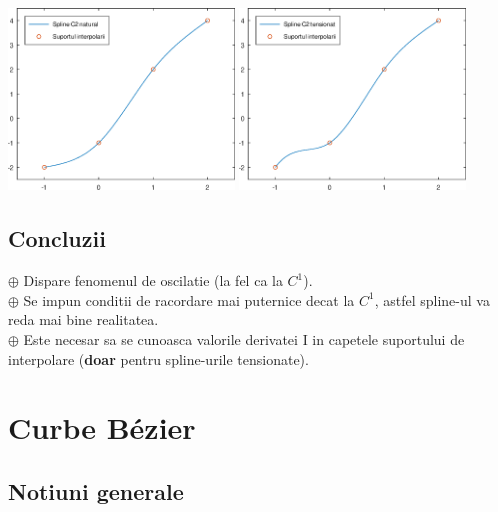 \documentclass{article}
\begin{document}
\begin{center}
    \includegraphics[width=0.45\textwidth]{spline_c2_nat_ex}\hspace{0.5cm}
    \includegraphics[width=0.45\textwidth]{spline_c2_ten_ex}
\end{center}

\subsection{Concluzii}
\tab
$\oplus$ Dispare fenomenul de oscilatie (la fel ca la $C^1$).\\

$\oplus$ Se impun conditii de racordare mai puternice decat la $C^1$, astfel spline-ul va reda mai bine realitatea.\\

$\oplus$ Este necesar sa se cunoasca valorile derivatei I in capetele suportului de interpolare (\textbf{doar} pentru spline-urile tensionate). \\

\section{Curbe B\'ezier}
\label{sec:bezier}

\subsection{Notiuni generale}
\end{document}
